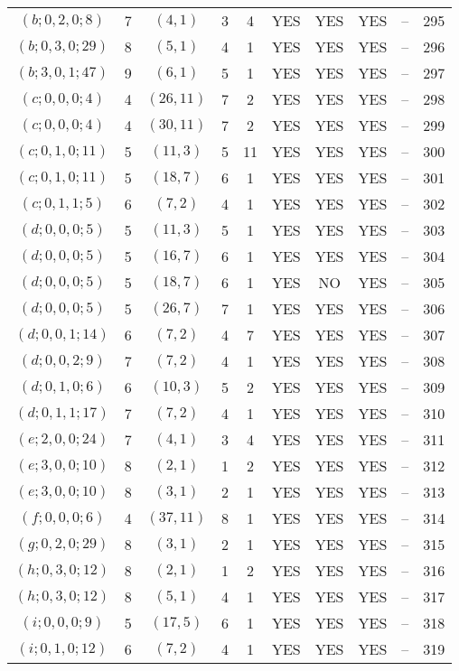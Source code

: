 \begin{longtable}{|c|c|c|c|c|c|c|c|c|c|}
$(b; 0, 2, 0; 8)$ & 7 & $(4, 1)$ & 3 & 4 & YES & YES & YES & -- & 295\\
$(b; 0, 3, 0; 29)$ & 8 & $(5, 1)$ & 4 & 1 & YES & YES & YES & -- & 296\\
$(b; 3, 0, 1; 47)$ & 9 & $(6, 1)$ & 5 & 1 & YES & YES & YES & -- & 297\\
$(c; 0, 0, 0; 4)$ & 4 & $(26, 11)$ & 7 & 2 & YES & YES & YES & -- & 298\\
$(c; 0, 0, 0; 4)$ & 4 & $(30, 11)$ & 7 & 2 & YES & YES & YES & -- & 299\\
$(c; 0, 1, 0; 11)$ & 5 & $(11, 3)$ & 5 & 11 & YES & YES & YES & -- & 300\\
$(c; 0, 1, 0; 11)$ & 5 & $(18, 7)$ & 6 & 1 & YES & YES & YES & -- & 301\\
$(c; 0, 1, 1; 5)$ & 6 & $(7, 2)$ & 4 & 1 & YES & YES & YES & -- & 302\\
$(d; 0, 0, 0; 5)$ & 5 & $(11, 3)$ & 5 & 1 & YES & YES & YES & -- & 303\\
$(d; 0, 0, 0; 5)$ & 5 & $(16, 7)$ & 6 & 1 & YES & YES & YES & -- & 304\\
$(d; 0, 0, 0; 5)$ & 5 & $(18, 7)$ & 6 & 1 & YES & NO & YES & -- & 305\\
$(d; 0, 0, 0; 5)$ & 5 & $(26, 7)$ & 7 & 1 & YES & YES & YES & -- & 306\\
$(d; 0, 0, 1; 14)$ & 6 & $(7, 2)$ & 4 & 7 & YES & YES & YES & -- & 307\\
$(d; 0, 0, 2; 9)$ & 7 & $(7, 2)$ & 4 & 1 & YES & YES & YES & -- & 308\\
$(d; 0, 1, 0; 6)$ & 6 & $(10, 3)$ & 5 & 2 & YES & YES & YES & -- & 309\\
$(d; 0, 1, 1; 17)$ & 7 & $(7, 2)$ & 4 & 1 & YES & YES & YES & -- & 310\\
$(e; 2, 0, 0; 24)$ & 7 & $(4, 1)$ & 3 & 4 & YES & YES & YES & -- & 311\\
$(e; 3, 0, 0; 10)$ & 8 & $(2, 1)$ & 1 & 2 & YES & YES & YES & -- & 312\\
$(e; 3, 0, 0; 10)$ & 8 & $(3, 1)$ & 2 & 1 & YES & YES & YES & -- & 313\\
$(f; 0, 0, 0; 6)$ & 4 & $(37, 11)$ & 8 & 1 & YES & YES & YES & -- & 314\\
$(g; 0, 2, 0; 29)$ & 8 & $(3, 1)$ & 2 & 1 & YES & YES & YES & -- & 315\\
$(h; 0, 3, 0; 12)$ & 8 & $(2, 1)$ & 1 & 2 & YES & YES & YES & -- & 316\\
$(h; 0, 3, 0; 12)$ & 8 & $(5, 1)$ & 4 & 1 & YES & YES & YES & -- & 317\\
$(i; 0, 0, 0; 9)$ & 5 & $(17, 5)$ & 6 & 1 & YES & YES & YES & -- & 318\\
$(i; 0, 1, 0; 12)$ & 6 & $(7, 2)$ & 4 & 1 & YES & YES & YES & -- & 319
\end{longtable}

